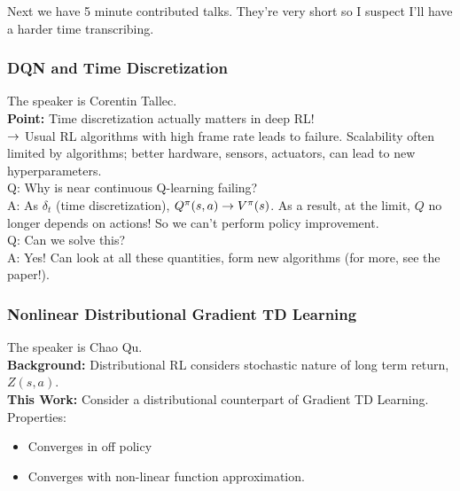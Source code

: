 Next we have 5 minute contributed talks. They're very short so I suspect I'll have a harder time transcribing.

\subsubsection{DQN and Time Discretization~\cite{tallec2019making}}

The speaker is Corentin Tallec. \\

{\bf Point:} Time discretization actually matters in deep RL! \\

$\rightarrow$ Usual RL algorithms with high frame rate leads to failure. Scalability often limited by algorithms; better hardware, sensors, actuators, can lead to new hyperparameters. \\

Q: Why is near continuous Q-learning failing? \\

A: As $\delta_t$ (time discretization), $Q^\pi(s,a) \rightarrow V^\pi(s)$. As a result, at the limit, $Q$ no longer depends on actions! So we can't perform policy improvement. \\

Q: Can we solve this? \\

A: Yes! Can look at all these quantities, form new algorithms (for more, see the paper!). 

\spacerule

\subsubsection{Nonlinear Distributional Gradient TD Learning~\cite{qu2018nonlinear}}

The speaker is Chao Qu. \\
 
{\bf Background:} Distributional RL considers stochastic nature of long term return, $Z(s,a)$. \\

{\bf This Work:} Consider a distributional counterpart of Gradient TD Learning. Properties:
\begin{itemize}
    \item Converges in off policy
    \item Converges with non-linear function approximation.
\end{itemize}


